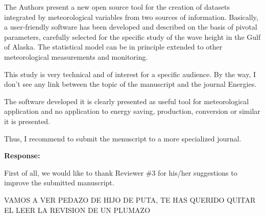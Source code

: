 \documentclass[a4paper,twoside,11pt]{article}
\newcounter{comments}[section]
\newcommand{\rcomment}[1]
{
	\stepcounter{comments}
	\vspace{0.6cm}
	\begin{tcolorbox}[colback=black!5,colframe=white!45!black,title=Comment \arabic{comments}]
		#1
	\end{tcolorbox}
}
\begin{document}
\rcomment{
The Authors present a new open source tool for the creation of datasets integrated by meteorological variables from two sources
of information. Basically, a user-friendly software has been developed and described on the basis of pivotal parameters, carefully selected for the specific study of the wave height in the Gulf of Alaska. The statistical model can be in principle extended to other meteorological measurements and monitoring. 

\vspace{0.5cm}
This study is very technical and of interest for a specific audience. By the way, I don’t see any link between the topic of the manuscript and the journal Energies.

\vspace{0.5cm}
The software developed it is clearly presented as useful tool for meteorological application and no application to energy saving, production, conversion or similar it is presented.

\vspace{0.5cm}
Thus, I recommend to submit the menuscript to a more specialized journal.
}

\textbf{Response:}
{
First of all, we would like to thank Reviewer \#3 for his/her suggestions to improve the submitted manuscript.

\vspace{0.5cm}
VAMOS A VER PEDAZO DE HIJO DE PUTA, TE HAS QUERIDO QUITAR EL LEER LA REVISION DE UN PLUMAZO
}
\end{document}
